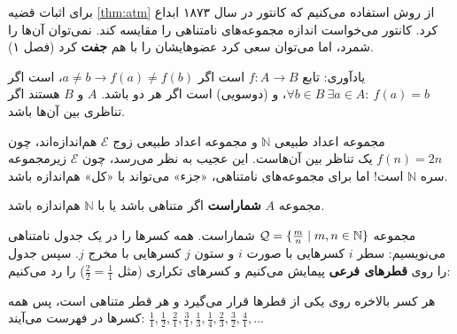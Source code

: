 برای اثبات قضیه \ref{thm:atm} از روش  استفاده می‌کنیم که کانتور در سال ۱۸۷۳ ابداع کرد. کانتور می‌خواست اندازه مجموعه‌های نامتناهی را مقایسه کند. نمی‌توان آن‌ها را شمرد، اما می‌توان سعی کرد عضوهایشان را با هم \textbf{جفت} کرد (فصل ۱).

یادآوری: تابع $f:A\to B$  است اگر $a\neq b\rightarrow f(a)\neq f(b)$،  است اگر $\forall b\in B\ \exists a\in A:\ f(a)=b$، و  (دوسویی) است اگر هر دو باشد. $A$ و $B$  هستند اگر تناظری بین آن‌ها باشد.

\begin{example}
مجموعه اعداد طبیعی $\mathbb{N}$ و مجموعه اعداد طبیعی زوج $\mathcal{E}$ هم‌اندازه‌اند، چون $f(n)=2n$ یک تناظر بین آن‌هاست. این عجیب به نظر می‌رسد، چون $\mathcal{E}$ زیرمجموعه سره $\mathbb{N}$ است! اما برای مجموعه‌های نامتناهی، «جزء» می‌تواند با «کل» هم‌اندازه باشد.
\end{example}

\begin{definition}[شمارا]
مجموعه $A$ \textbf{شماراست} اگر متناهی باشد یا با $\mathbb{N}$ هم‌اندازه باشد.
\end{definition}

\begin{example}
مجموعه $\mathcal{Q}=\{\tfrac mn\mid m,n\in\mathbb{N}\}$ شماراست. همه کسرها را در یک جدول نامتناهی می‌نویسیم: سطر $i$ کسرهایی با صورت $i$ و ستون $j$ کسرهایی با مخرج $j$. سپس جدول را روی \textbf{قطرهای فرعی} پیمایش می‌کنیم و کسرهای تکراری (مثل $\tfrac22=\tfrac11$) را رد می‌کنیم:
\begin{ltrfig}
\end{ltrfig}
هر کسر بالاخره روی یکی از قطرها قرار می‌گیرد و هر قطر متناهی است، پس همه کسرها در فهرست می‌آیند: $\tfrac11,\tfrac12,\tfrac21,\tfrac31,\tfrac13,\tfrac14,\tfrac23,\tfrac32,\tfrac41,\dots$
\end{example}

